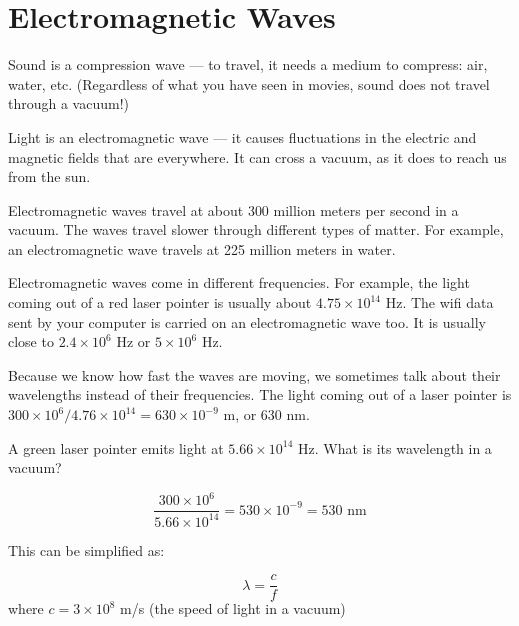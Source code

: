 \chapter{Electromagnetic Waves}

Sound is a compression wave --- to travel, it needs a medium to
compress: air, water, etc. (Regardless of what you have seen in
movies, sound does not travel through a vacuum!)

Light is an electromagnetic wave --- it causes fluctuations in the
electric and magnetic fields that are everywhere. It can cross a
vacuum, as it does to reach us from the sun.

Electromagnetic waves travel at about 300 million meters per second in a
vacuum. The waves travel slower through different types of matter. For example, an
electromagnetic wave travels at 225 million meters in water.

Electromagnetic waves come in different frequencies. For example, the
light coming out of a red laser pointer is usually about $4.75 \times
10^{14}$ Hz.  The wifi data sent by your computer is carried on an
electromagnetic wave too. It is usually close to $2.4 \times 10^6$ Hz
or $5 \times 10^6$ Hz.

Because we know how fast the waves are moving, we sometimes talk about
their wavelengths instead of their frequencies.  The light coming out
of a laser pointer is $300 \times 10^6 / 4.76 \times 10^{14} = 630
\times 10^{-9}$ m, or 630 nm.

\begin{Exercise}[title={Wavelengths}, label=wave_length_green]

  A green laser pointer emits light at $5.66 \times
10^{14}$ Hz. What is its wavelength in a vacuum?
  
\end{Exercise}
\begin{Answer}[ref=wave_length_green]
$$\frac{300 \times 10^6}{5.66 \times 10^{14}} = 530 \times 10^{-9} = 530\text{ nm}$$
\end{Answer}

This can be simplified as:

$$\lambda = \frac{c}{f}$$
where $c = 3 \times 10^8$ m/s (the speed of light in a vacuum)

